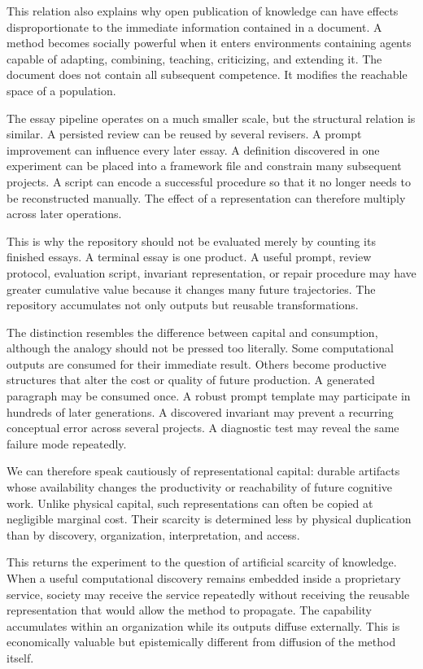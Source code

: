 \documentclass[11pt]{article}
\begin{document}
This relation also explains why open publication of knowledge can have effects disproportionate to the immediate information contained in a document. A method becomes socially powerful when it enters environments containing agents capable of adapting, combining, teaching, criticizing, and extending it. The document does not contain all subsequent competence. It modifies the reachable space of a population.

The essay pipeline operates on a much smaller scale, but the structural relation is similar. A persisted review can be reused by several revisers. A prompt improvement can influence every later essay. A definition discovered in one experiment can be placed into a framework file and constrain many subsequent projects. A script can encode a successful procedure so that it no longer needs to be reconstructed manually. The effect of a representation can therefore multiply across later operations.

This is why the repository should not be evaluated merely by counting its finished essays. A terminal essay is one product. A useful prompt, review protocol, evaluation script, invariant representation, or repair procedure may have greater cumulative value because it changes many future trajectories. The repository accumulates not only outputs but reusable transformations.

The distinction resembles the difference between capital and consumption, although the analogy should not be pressed too literally. Some computational outputs are consumed for their immediate result. Others become productive structures that alter the cost or quality of future production. A generated paragraph may be consumed once. A robust prompt template may participate in hundreds of later generations. A discovered invariant may prevent a recurring conceptual error across several projects. A diagnostic test may reveal the same failure mode repeatedly.

We can therefore speak cautiously of representational capital: durable artifacts whose availability changes the productivity or reachability of future cognitive work. Unlike physical capital, such representations can often be copied at negligible marginal cost. Their scarcity is determined less by physical duplication than by discovery, organization, interpretation, and access.

This returns the experiment to the question of artificial scarcity of knowledge. When a useful computational discovery remains embedded inside a proprietary service, society may receive the service repeatedly without receiving the reusable representation that would allow the method to propagate. The capability accumulates within an organization while its outputs diffuse externally. This is economically valuable but epistemically different from diffusion of the method itself.
\end{document}
